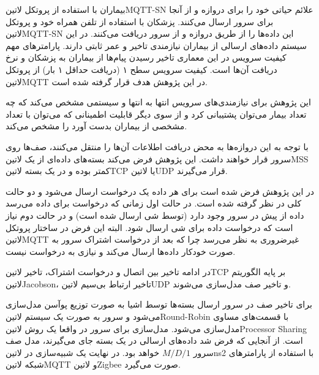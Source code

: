 بیماران با استفاده از پروتکل ‌لاتین{MQTT-SN} علائم حیاتی خود را برای دروازه و از آنجا برای سرور ارسال می‌کنند.
پزشکان با استفاده از تلفن همراه خود و پروتکل ‌لاتین{MQTT-SN} این داده‌ها را از طریق دروازه و از سرور دریافت می‌کنند.
در این سیستم داده‌های ارسالی از بیماران نیازمندی تاخیر و عمر ثابتی دارند.
پارامترهای مهم کیفیت سرویس در این معماری تاخیر رسیدن پیام‌ها از بیماران به پزشکان و نرخ دریافت آن‌ها است.
کیفیت سرویس سطح ۱ (دریافت حداقل ۱ بار) از پروتکل ‌لاتین{MQTT} در این پژوهش هدف قرار گرفته شده است.

این پژوهش برای نیازمندی‌های سرویس انتها به انتها و سیستمی مشخص می‌کند که چه تعداد بیمار می‌توان پشتیبانی کرد
و از سوی دیگر قابلیت اطمینانی که می‌توان با تعداد مشخصی از بیماران بدست آورد را مشخص می‌کند.

با توجه به این دروازه‌ها به محض دریافت اطلاعات آن‌ها را منتقل می‌کنند، صف‌ها روی سرور قرار خواهند داشت.
این پژوهش فرض می‌کند بسته‌های داده‌ای از یک ‌لاتین{MSS} کمتر بوده و در یک بسته ‌لاتین{TCP} یا ‌لاتین{UDP}
قرار می‌گیرند.

در این پژوهش فرض شده است برای هر داده یک درخواست ارسال می‌شود و دو حالت کلی در نظر گرفته شده است. در حالت اول
زمانی که درخواست برای داده می‌رسد داده از پیش در سرور وجود دارد (توسط شی ارسال شده است) و در حالت دوم نیاز است
که درخواست داده برای شی ارسال شود. البته این فرض در ساختار پروتکل ‌لاتین{MQTT} غیرضروری به نظر می‌رسد چرا که
بعد از درخواست اشتراک سرور به صورت خودکار داده‌ها ارسال می‌کند و نیازی به درخواست نیست.

در ادامه تاخیر بین اتصال و درخواست اشتراک، تاخیر ‌لاتین{TCP} بر پایه الگوریتم ‌لاتین{Jacobson}،
تاخیر ارتباط بی‌سیم ‌لاتین{UDP} و تاخیر صف مدل‌سازی می‌شوند.

برای تاخیر صف در سرور ارسال بسته‌ها توسط اشیا به صورت توزیع پوآسن مدل‌سازی می‌شود و سرور به صورت
یک سیستم ‌لاتین{Round-Robin} با قسمت‌های مساوی مدل‌سازی می‌شود.
مدل‌سازی برای سرور در واقعا یک روش ‌لاتین{Processor Sharing} است.
از آنجایی که فرض شد داده‌های ارسالی در یک بسته جای می‌گیرند، مدل صف سرور $M/D/1$ خواهد بود.
در نهایت یک شبیه‌سازی در ‌لاتین{ns2} با استفاده از پارامترهای شبکه ‌لاتین{MQTT} و ‌لاتین{Zigbee}
صورت می‌گیرد.
